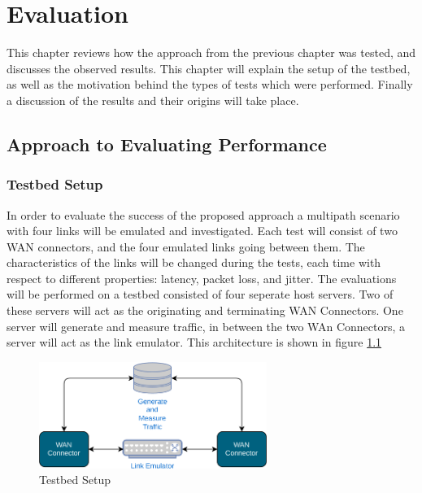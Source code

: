 
\cleardoublepage
\chapter{Evaluation}
\label{cha:evaluation}

This chapter reviews how the approach from the previous chapter was tested, and discusses the observed results. This chapter will explain the setup of the testbed, as well as the motivation behind the types of tests which were performed. Finally a discussion of the results and their origins will take place.


\section{Approach to Evaluating Performance}

\subsection{Testbed Setup}

In order to evaluate the success of the proposed approach a multipath scenario with four links will be emulated and investigated. Each test will consist of two WAN connectors, and the four emulated links going between them. The characteristics of the links will be changed during the tests, each time with respect to different properties: latency, packet loss, and jitter. The evaluations will be performed on a testbed consisted of four seperate host servers. Two of these servers will act as the originating and terminating WAN Connectors. One server will generate and measure traffic, in between the two WAn Connectors, a server will act as the link emulator. This architecture is shown in figure \ref{fig:testbed}

\begin{figure}[h]
    \centering
        \includegraphics[width=0.66\textwidth]{fig/testbed.png}
        \caption{Testbed Setup}
        \label{fig:testbed}
\end{figure}

